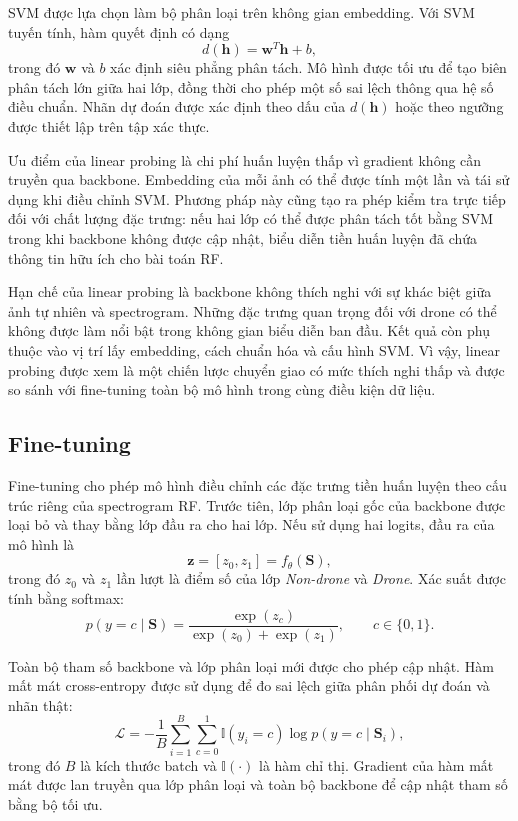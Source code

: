 \documentclass[../DoAn.tex]{subfiles}
\begin{document}
SVM được lựa chọn làm bộ phân loại trên không gian embedding. Với SVM tuyến tính, hàm quyết định có dạng
\begin{equation}
    d(\mathbf{h})=\mathbf{w}^{T}\mathbf{h}+b,
\end{equation}
trong đó $\mathbf{w}$ và $b$ xác định siêu phẳng phân tách. Mô hình được tối ưu để tạo biên phân tách lớn giữa hai lớp, đồng thời cho phép một số sai lệch thông qua hệ số điều chuẩn. Nhãn dự đoán được xác định theo dấu của $d(\mathbf{h})$ hoặc theo ngưỡng được thiết lập trên tập xác thực.

Ưu điểm của linear probing là chi phí huấn luyện thấp vì gradient không cần truyền qua backbone. Embedding của mỗi ảnh có thể được tính một lần và tái sử dụng khi điều chỉnh SVM. Phương pháp này cũng tạo ra phép kiểm tra trực tiếp đối với chất lượng đặc trưng: nếu hai lớp có thể được phân tách tốt bằng SVM trong khi backbone không được cập nhật, biểu diễn tiền huấn luyện đã chứa thông tin hữu ích cho bài toán RF.

Hạn chế của linear probing là backbone không thích nghi với sự khác biệt giữa ảnh tự nhiên và spectrogram. Những đặc trưng quan trọng đối với drone có thể không được làm nổi bật trong không gian biểu diễn ban đầu. Kết quả còn phụ thuộc vào vị trí lấy embedding, cách chuẩn hóa và cấu hình SVM. Vì vậy, linear probing được xem là một chiến lược chuyển giao có mức thích nghi thấp và được so sánh với fine-tuning toàn bộ mô hình trong cùng điều kiện dữ liệu.

\subsection{Fine-tuning}

Fine-tuning cho phép mô hình điều chỉnh các đặc trưng tiền huấn luyện theo cấu trúc riêng của spectrogram RF. Trước tiên, lớp phân loại gốc của backbone được loại bỏ và thay bằng lớp đầu ra cho hai lớp. Nếu sử dụng hai logits, đầu ra của mô hình là
\begin{equation}
    \mathbf{z}
    =
    [z_0,z_1]
    =
    f_{\theta}(\mathbf{S}),
\end{equation}
trong đó $z_0$ và $z_1$ lần lượt là điểm số của lớp \textit{Non-drone} và \textit{Drone}. Xác suất được tính bằng softmax:
\begin{equation}
    p(y=c\mid\mathbf{S})
    =
    \frac{\exp(z_c)}
    {\exp(z_0)+\exp(z_1)},
    \qquad c\in\{0,1\}.
\end{equation}

Toàn bộ tham số backbone và lớp phân loại mới được cho phép cập nhật. Hàm mất mát cross-entropy được sử dụng để đo sai lệch giữa phân phối dự đoán và nhãn thật:
\begin{equation}
    \mathcal{L}
    =
    -\frac{1}{B}
    \sum_{i=1}^{B}
    \sum_{c=0}^{1}
    \mathbb{I}(y_i=c)
    \log p(y=c\mid\mathbf{S}_i),
\end{equation}
trong đó $B$ là kích thước batch và $\mathbb{I}(\cdot)$ là hàm chỉ thị. Gradient của hàm mất mát được lan truyền qua lớp phân loại và toàn bộ backbone để cập nhật tham số bằng bộ tối ưu.
\end{document}
